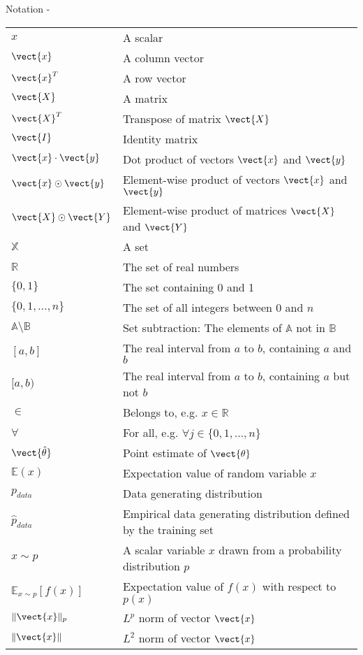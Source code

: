 
\begin{frame}[allowframebreaks,t]{Notation -}

    {
\small    

\begin{longtable}{| p{} | p{} |} 
$x$                        & A scalar \\
$\vect{x}$                 & A column vector \\
$\vect{x}^T$               & A row vector \\
$\vect{X}$                 & A matrix \\
$\vect{X}^T$               & Transpose of matrix  $\vect{X}$ \\
$\vect{I}$                 & Identity matrix \\
$\vect{x} \cdot \vect{y}$  & Dot product of vectors $\vect{x}$ and $\vect{y}$ \\
$\vect{x} \odot \vect{y}$  & Element-wise product of vectors $\vect{x}$ and $\vect{y}$ \\
$\vect{X} \odot \vect{Y}$  & Element-wise product of matrices $\vect{X}$ and $\vect{Y}$ \\
$\mathbb{X}$               & A set \\
$\mathbb{R}$               & The set of real numbers \\
$\{0,1\}$                  & The set containing 0 and 1 \\
$\{0,1,...,n\}$            & The set of all integers between 0 and $n$ \\
$\mathbb{A}\setminus\mathbb{B}$  
                           & Set subtraction: The elements of $\mathbb{A}$ not in $\mathbb{B}$\\
$[a,b]$                    & The real interval from $a$ to $b$, containing $a$ and $b$\\
$[a,b)$                    & The real interval from $a$ to $b$, containing $a$ but not $b$\\
$\in$                      & Belongs to, e.g. $x \in \mathbb{R}$ \\
$\forall$                  & For all, e.g. $\forall j \in \{0,1,...,n\}$ \\
$\vect{\hat{\theta}}$      & Point estimate of $\vect{\theta}$ \\
$\mathbb{E}(x)$            & Expectation value of random variable $x$ \\
$p_{data}$                 & Data generating distribution \\
$\hat{p}_{data}$           & Empirical data generating distribution defined by the training set\\
$x{\sim}p$                 & A scalar variable $x$ drawn from a probability distribution $p$\\
$\mathbb{E}_{x{\sim}p}[f(x)]$           
                           & Expectation value of $f(x)$ with respect to $p(x)$\\
$\lVert\vect{x}\rVert{_p}$ & $L^p$ norm of vector $\vect{x}$\\
$\lVert\vect{x}\rVert$     & $L^2$ norm of vector $\vect{x}$\\
\end{longtable}
}
\end{frame}
